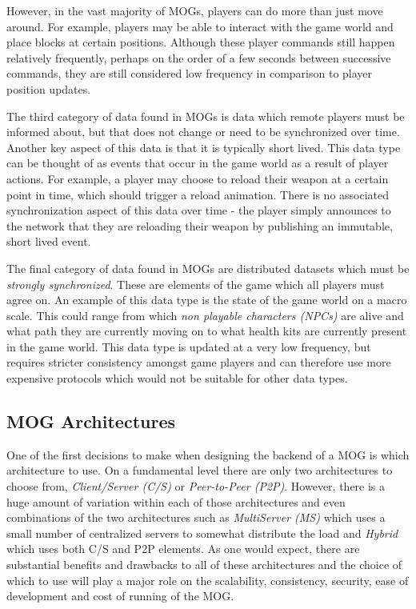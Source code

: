 However, in the vast majority of MOGs, players can do more than just move around. For example, players may be able to interact with the game world and place blocks at certain positions. Although these player commands still happen relatively frequently, perhaps on the order of a few seconds between successive commands, they are still considered low frequency in comparison to player position updates. 

The third category of data found in MOGs is data which remote players must be informed about, but that does not change or need to be synchronized over time. Another key aspect of this data is that it is typically short lived. This data type can be thought of as events that occur in the game world as a result of player actions. For example, a player may choose to reload their weapon at a certain point in time, which should trigger a reload animation. There is no associated synchronization aspect of this data over time - the player simply announces to the network that they are reloading their weapon by publishing an immutable, short lived event.

The final category of data found in MOGs are distributed datasets which must be \textit{strongly synchronized}. These are elements of the game which all players must agree on. An example of this data type is the state of the game world on a macro scale. This could range from which \textit{non playable characters (NPCs)} are alive and what path they are currently moving on to what health kits are currently present in the game world. This data type is updated at a very low frequency, but requires stricter consistency amongst game players and can therefore use more expensive protocols which would not be suitable for other data types.


\subsection{MOG Architectures}
One of the first decisions to make when designing the backend of a MOG is which architecture to use. On a fundamental level there are only two architectures to choose from, \textit{Client/Server (C/S)} or \textit{Peer-to-Peer (P2P)}. However, there is a huge amount of variation within each of those architectures and even combinations of the two architectures such as \textit{MultiServer (MS)} which uses a small number of centralized servers to somewhat distribute the load and \textit{Hybrid} which uses both C/S and P2P elements. As one would expect, there are substantial benefits and drawbacks to all of these architectures and the choice of which to use will play a major role on the scalability, consistency, security, ease of development and cost of running of the MOG. 

